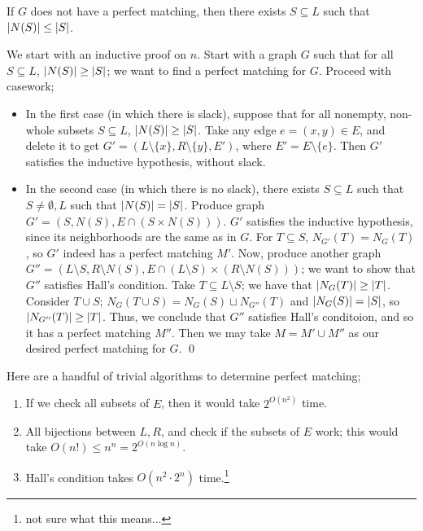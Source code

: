 \begin{simplethm}
    If $G$ does not have a perfect matching, then there exists $S \subseteq L$ such that $\left\lvert N(S) \right\rvert \leq \left\lvert S \right\rvert$.
\end{simplethm}
\noindent We start with an inductive proof on $n$. Start with a graph $G$ such that for all $S \subseteq L$, $\left\lvert N(S) \right\rvert \geq \left\lvert S \right\rvert$; we want to find a perfect matching for $G$. Proceed with casework;
\begin{itemize}
    \item In the first case (in which there is slack), suppose that for all nonempty, non-whole subsets $S \subseteq L$, $\left\lvert N(S) \right\rvert \geq \left\lvert S \right\rvert$. Take any edge $e = (x, y) \in E$, and delete it to get $G' = (L \setminus \{x\}, R \setminus \{y\}, E')$, where $E' = E \setminus \{e\}$. Then $G'$ satisfies the inductive hypothesis, without slack.
    \item In the second case (in which there is no slack), there exists $S \subseteq L$ such that $S \neq \emptyset, L$ such that $\left\lvert N(S) \right\rvert = \left\lvert S \right\rvert$. Produce graph $G' = (S, N(S), E \cap (S \times N(S)))$. $G'$ satisfies the inductive hypothesis, since its neighborhoods are the same as in $G$. For $T \subseteq S$, $N_{G'}(T) = N_G(T)$, so $G'$ indeed has a perfect matching $M'$.
    \medskip\newline
    Now, produce another graph $G'' = (L \setminus S, R \setminus N(S), E \cap (L \setminus S) \times (R \setminus N(S)))$; we want to show that $G''$ satisfies Hall's condition. Take $T \subseteq L \setminus S$; we have that $\left\lvert N_G(T) \right\rvert \geq \left\lvert T \right\rvert$. Consider $T \cup S$; $N_G(T \cup S) = N_G(S) \sqcup N_{G''}(T)$ and $\left\lvert N_G(S) \right\rvert = \left\lvert S \right\rvert$, so $\left\lvert N_{G''}(T) \right\rvert \geq \left\lvert T \right\rvert$. Thus, we conclude that $G''$ satisfies Hall's conditoion, and so it has a perfect matching $M''$. Then we may take $M = M' \cup M''$ as our desired perfect matching for $G$. \qed
\end{itemize}
Here are a handful of trivial algorithms to determine perfect matching;
\begin{enumerate}[label=(\alph*)]
    \item If we check all subsets of $E$, then it would take $2^{O(n^2)}$ time.
    \item All bijections between $L, R$, and check if the subsets of $E$ work; this would take $O(n!) \leq n^n = 2^{O(n \log n)}$.
    \item Hall's condition takes $O(n^2 \cdot 2^n)$ time.\footnote{not sure what this means...}
\end{enumerate}
